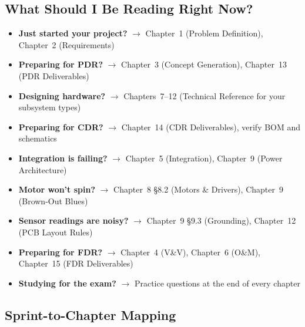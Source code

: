\documentclass[11pt,letterpaper,twoside,openany]{book}
\begin{document}
\subsection*{What Should I Be Reading Right Now?}
\begin{itemize}[nosep,leftmargin=1.5em]
\item \textbf{Just started your project?} $\to$ Chapter~1 (Problem Definition), Chapter~2 (Requirements)
\item \textbf{Preparing for PDR?} $\to$ Chapter~3 (Concept Generation), Chapter~13 (PDR Deliverables)
\item \textbf{Designing hardware?} $\to$ Chapters~7--12 (Technical Reference for your subsystem types)
\item \textbf{Preparing for CDR?} $\to$ Chapter~14 (CDR Deliverables), verify BOM and schematics
\item \textbf{Integration is failing?} $\to$ Chapter~5 (Integration), Chapter~9 (Power Architecture)
\item \textbf{Motor won't spin?} $\to$ Chapter~8 \S8.2 (Motors \& Drivers), Chapter~9 (Brown-Out Blues)
\item \textbf{Sensor readings are noisy?} $\to$ Chapter~9 \S9.3 (Grounding), Chapter~12 (PCB Layout Rules)
\item \textbf{Preparing for FDR?} $\to$ Chapter~4 (V\&V), Chapter~6 (O\&M), Chapter~15 (FDR Deliverables)
\item \textbf{Studying for the exam?} $\to$ Practice questions at the end of every chapter
\end{itemize}

\subsection*{Sprint-to-Chapter Mapping}
\end{document}
